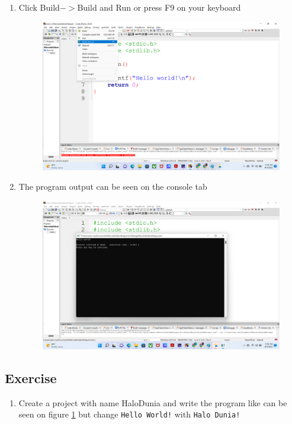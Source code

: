 \begin{enumerate}
\begin{figure}[H]
	\caption{}
	\label{fig:screenshot008}
\end{figure}
\item Click Build$->$Build and Run or press F9 on your keyboard
\begin{figure}[H]
	\centering
	\includegraphics[width=0.7\linewidth]{../P1/img/screenshot009.png}
	\caption{}
	\label{fig:screenshot009}
\end{figure}
\item The program output can be seen on the console tab
\begin{figure}[H]
	\centering
	\includegraphics[width=0.7\linewidth]{../P1/img/screenshot010.png}
	\caption{}
	\label{fig:screenshot010}
\end{figure}
\end{enumerate}

\subsection{Exercise}
\begin{enumerate}
	\item Create a project with name HaloDunia and write the program like can be seen on figure \ref{fig:screenshot008} but change \verb|Hello World!| with \verb|Halo Dunia!|
\end{enumerate}

